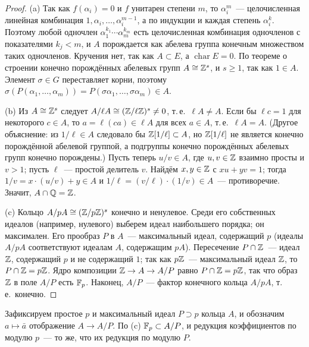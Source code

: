 \begin{proof}
(a) Так как $f(\alpha_i)=0$ и $f$ унитарен степени $m$, то $\alpha_i^m$~--- целочисленная линейная комбинация
$1,\alpha_i,\dots,\alpha_i^{m-1}$, а по индукции и каждая степень $\alpha_i^k$. Поэтому любой одночлен
$\alpha_1^{k_1}\cdots\alpha_m^{k_m}$ есть целочисленная комбинация одночленов с показателями $k_j<m$, и $A$ порождается как
абелева группа конечным множеством таких одночленов. Кручения нет, так как $A\subset E$, а $\operatorname{char}E=0$. По
теореме о строении конечно порождённых абелевых групп $A\cong\mathbb Z^s$, и $s\ge1$, так как $1\in A$. Элемент $\sigma\in G$
переставляет корни, поэтому $\sigma(P(\alpha_1,\dots,\alpha_m))=P(\sigma\alpha_1,\dots,\sigma\alpha_m)\in A$.

(b) Из $A\cong\mathbb Z^s$ следует $A/\ell A\cong(\mathbb Z/\ell\mathbb Z)^s\ne0$, т.\,е.\ $\ell A\ne A$. Если бы $\ell c=1$ для некоторого
$c\in A$, то $a=\ell(ca)\in\ell A$ для всех $a\in A$, т.\,е.\ $\ell A=A$. (Другое объяснение: из $1/\ell\in A$ следовало
бы $\mathbb Z[1/\ell]\subset A$, но $\mathbb Z[1/\ell]$ не является конечно порождённой абелевой группой, а подгруппы конечно порождённых
абелевых групп конечно порождены.) Пусть теперь $u/v\in A$, где $u,v\in\mathbb Z$ взаимно просты и $v>1$; пусть $\ell$~---
простой делитель $v$. Найдём $x,y\in\mathbb Z$ с $xu+yv=1$; тогда $1/v=x\cdot(u/v)+y\in A$ и $1/\ell=(v/\ell)\cdot(1/v)\in A$~---
противоречие. Значит, $A\cap\mathbb Q=\mathbb Z$.

(c) Кольцо $A/pA\cong(\mathbb Z/p\mathbb Z)^s$ конечно и ненулевое. Среди его собственных идеалов (например, нулевого) выберем
идеал наибольшего порядка; он максимален. Его прообраз $P$ в $A$~--- максимальный идеал, содержащий $p$ (идеалы $A/pA$
соответствуют идеалам $A$, содержащим $pA$). Пересечение $P\cap\mathbb Z$~--- идеал $\mathbb Z$, содержащий $p$ и не содержащий $1$; так
как $p\mathbb Z$~--- максимальный идеал $\mathbb Z$, то $P\cap\mathbb Z=p\mathbb Z$. Ядро композиции $\mathbb Z\to A\to A/P$ равно $P\cap\mathbb Z=p\mathbb Z$, так что
образ $\mathbb Z$ в поле $A/P$ есть $\mathbb F_p$. Наконец, $A/P$~--- фактор конечного кольца $A/pA$, т.\,е.\ конечно.
\end{proof}

Зафиксируем простое $p$ и максимальный идеал $P\supset p$ кольца $A$, и обозначим $a\mapsto\bar a$ отображение
$A\to A/P$. По (c) $\mathbb F_p\subset A/P$, и редукция коэффициентов по модулю $p$~--- то же, что их редукция по
модулю $P$.

